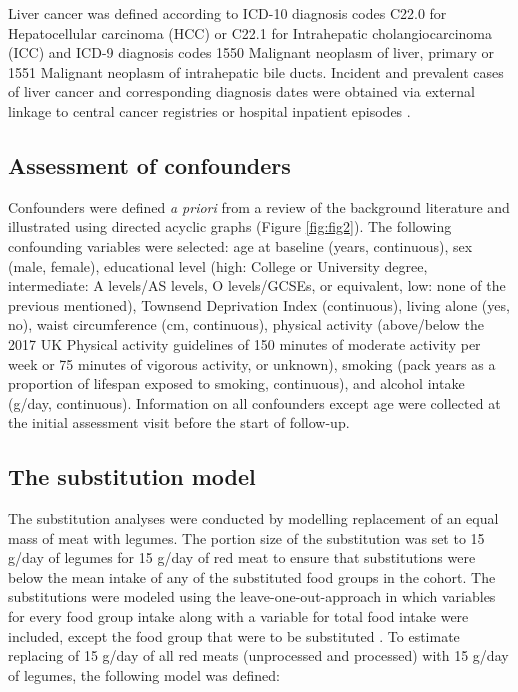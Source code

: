 \documentclass[nutrients,article,submit,moreauthors,pdftex]{Definitions/mdpi}
\begin{document}
Liver cancer was defined according to ICD-10 diagnosis codes C22.0 for
Hepatocellular carcinoma (HCC) or C22.1 for Intrahepatic
cholangiocarcinoma (ICC) and ICD-9 diagnosis codes 1550 Malignant
neoplasm of liver, primary or 1551 Malignant neoplasm of intrahepatic
bile ducts. Incident and prevalent cases of liver cancer and
corresponding diagnosis dates were obtained via external linkage to
central cancer registries or hospital inpatient episodes \citep{RN112, RN114}.

\hypertarget{subsec4}{%
\subsection{Assessment of confounders}\label{subsec4}}

Confounders were defined \emph{a priori} from a review of the background
literature and illustrated using directed acyclic graphs (Figure
\ref{fig:fig2}). The following confounding variables were selected: age
at baseline (years, continuous), sex (male, female), educational level
(high: College or University degree, intermediate: A levels/AS levels, O
levels/GCSEs, or equivalent, low: none of the previous mentioned),
Townsend Deprivation Index (continuous), living alone (yes, no), waist
circumference (cm, continuous), physical activity (above/below the 2017
UK Physical activity guidelines of 150 minutes of moderate activity per
week or 75 minutes of vigorous activity, or unknown), smoking (pack
years as a proportion of lifespan exposed to smoking, continuous), and
alcohol intake (g/day, continuous). Information on all confounders
except age were collected at the initial assessment visit before the
start of follow-up.

\hypertarget{subsec5}{%
\subsection{The substitution model}\label{subsec5}}

The substitution analyses were conducted by modelling replacement of an
equal mass of meat with legumes. The portion size of the substitution
was set to 15 g/day of legumes for 15 g/day of red meat to ensure that
substitutions were below the mean intake of any of the substituted food
groups in the cohort. The substitutions were modeled using the
leave-one-out-approach in which variables for every food group intake
along with a variable for total food intake were included, except the
food group that were to be substituted \citep{Ibsen2021}. To estimate
replacing of 15 g/day of all red meats (unprocessed and processed) with
15 g/day of legumes, the following model was defined:
\end{document}

